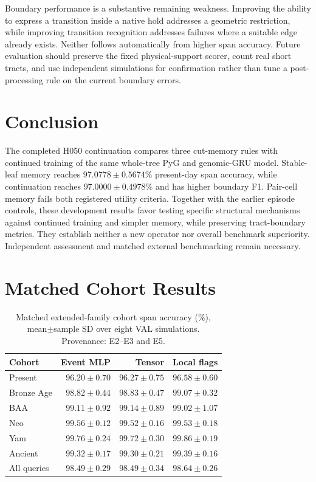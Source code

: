 \documentclass[letterpaper]{article}
\begin{document}
Boundary performance is a substantive remaining weakness. Improving the ability to express a transition inside a native hold addresses a geometric restriction, while improving transition recognition addresses failures where a suitable edge already exists. Neither follows automatically from higher span accuracy. Future evaluation should preserve the fixed physical-support scorer, count real short tracts, and use independent simulations for confirmation rather than tune a post-processing rule on the current boundary errors.

\section{Conclusion}
The completed H050 continuation compares three cut-memory rules with continued training of the same whole-tree PyG and genomic-GRU model. Stable-leaf memory reaches $97.0778\pm0.5674\%$ present-day span accuracy, while continuation reaches $97.0000\pm0.4978\%$ and has higher boundary F1. Pair-cell memory fails both registered utility criteria. Together with the earlier episode controls, these development results favor testing specific structural mechanisms against continued training and simpler memory, while preserving tract-boundary metrics. They establish neither a new operator nor overall benchmark superiority. Independent assessment and matched external benchmarking remain necessary.



\appendix
\section{Matched Cohort Results}
\label{app:matched}
\begin{table}[t]
\centering
\small
\begin{tabular}{lrrr}
\toprule
Cohort & Event MLP & Tensor & Local flags \\
\midrule
Present & $96.20\pm0.70$ & $96.27\pm0.75$ & $96.58\pm0.60$ \\
Bronze Age & $98.82\pm0.44$ & $98.83\pm0.47$ & $99.07\pm0.32$ \\
BAA & $99.11\pm0.92$ & $99.14\pm0.89$ & $99.02\pm1.07$ \\
Neo & $99.56\pm0.12$ & $99.52\pm0.16$ & $99.53\pm0.18$ \\
Yam & $99.76\pm0.24$ & $99.72\pm0.30$ & $99.86\pm0.19$ \\
Ancient & $99.32\pm0.17$ & $99.30\pm0.21$ & $99.39\pm0.16$ \\
All queries & $98.49\pm0.29$ & $98.49\pm0.34$ & $98.64\pm0.26$ \\
\bottomrule
\end{tabular}
\caption{Matched extended-family cohort span accuracy (\%), mean$\pm$sample SD over eight VAL simulations. Provenance: E2--E3 and E5.}
\label{tab:matchedcohorts}
\end{table}
\end{document}
